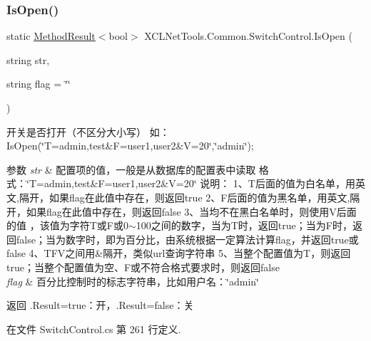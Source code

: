 \subsubsection{\texorpdfstring{Is\+Open()}{IsOpen()}}
{\footnotesize\ttfamily static \hyperlink{class_x_c_l_net_tools_1_1_entity_1_1_method_result}{Method\+Result}$<$bool$>$ X\+C\+L\+Net\+Tools.\+Common.\+Switch\+Control.\+Is\+Open (\begin{DoxyParamCaption}\item[{string}]{str,  }\item[{string}]{flag = {\ttfamily \char`\"{}\char`\"{}} }\end{DoxyParamCaption})\hspace{0.3cm}{\ttfamily [static]}}



开关是否打开（不区分大小写） 如：\+Is\+Open(\char`\"{}\+T=admin,test\&\+F=user1,user2\&\+V=20\char`\"{},\char`\"{}admin\char`\"{}); 


\begin{DoxyParams}{参数}
{\em str} & 配置项的值，一般是从数据库的配置表中读取 格式：\char`\"{}\+T=admin,test\&\+F=user1,user2\&\+V=20\char`\"{} 说明： 1、\+T后面的值为白名单，用英文,隔开，如果flag在此值中存在，则返回true 2、\+F后面的值为黑名单，用英文,隔开，如果flag在此值中存在，则返回false 3、当均不在黑白名单时，则使用\+V后面的值 ，该值为字符\+T或\+F或0$\sim$100之间的数字，当为\+T时，返回true；当为\+F时，返回false；当为数字时，即为百分比，由系统根据一定算法计算flag，并返回true或false 4、\+T\+F\+V之间用\&隔开，类似url查询字符串 5、当整个配置值为\+T，则返回true；当整个配置值为空、\+F或不符合格式要求时，则返回false \\
\hline
{\em flag} & 百分比控制时的标志字符串，比如用户名：\char`\"{}admin\char`\"{}\\
\hline
\end{DoxyParams}
\begin{DoxyReturn}{返回}
.Result=true：开，.\+Result=false：关
\end{DoxyReturn}


在文件 Switch\+Control.\+cs 第 261 行定义.

\mbox{\label{class_x_c_l_net_tools_1_1_common_1_1_switch_control_a12aeb06896faa380374bffdc5e648d31}} 
